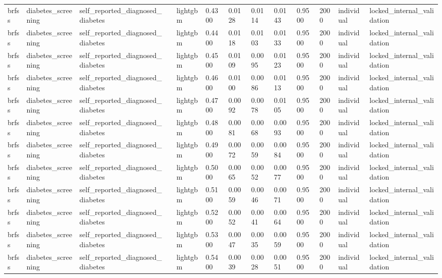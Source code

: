 \begin{tabular}{lllllllllllll}
brfss & diabetes\_screening & self\_reported\_diagnosed\_diabetes &  & lightgbm & 0.4300 & 0.0128 & 0.0114 & 0.0143 & 0.9500 & 2000 & individual & locked\_internal\_validation \\
brfss & diabetes\_screening & self\_reported\_diagnosed\_diabetes &  & lightgbm & 0.4400 & 0.0118 & 0.0103 & 0.0133 & 0.9500 & 2000 & individual & locked\_internal\_validation \\
brfss & diabetes\_screening & self\_reported\_diagnosed\_diabetes &  & lightgbm & 0.4500 & 0.0109 & 0.0095 & 0.0123 & 0.9500 & 2000 & individual & locked\_internal\_validation \\
brfss & diabetes\_screening & self\_reported\_diagnosed\_diabetes &  & lightgbm & 0.4600 & 0.0100 & 0.0086 & 0.0113 & 0.9500 & 2000 & individual & locked\_internal\_validation \\
brfss & diabetes\_screening & self\_reported\_diagnosed\_diabetes &  & lightgbm & 0.4700 & 0.0092 & 0.0078 & 0.0105 & 0.9500 & 2000 & individual & locked\_internal\_validation \\
brfss & diabetes\_screening & self\_reported\_diagnosed\_diabetes &  & lightgbm & 0.4800 & 0.0081 & 0.0068 & 0.0093 & 0.9500 & 2000 & individual & locked\_internal\_validation \\
brfss & diabetes\_screening & self\_reported\_diagnosed\_diabetes &  & lightgbm & 0.4900 & 0.0072 & 0.0059 & 0.0084 & 0.9500 & 2000 & individual & locked\_internal\_validation \\
brfss & diabetes\_screening & self\_reported\_diagnosed\_diabetes &  & lightgbm & 0.5000 & 0.0065 & 0.0052 & 0.0077 & 0.9500 & 2000 & individual & locked\_internal\_validation \\
brfss & diabetes\_screening & self\_reported\_diagnosed\_diabetes &  & lightgbm & 0.5100 & 0.0059 & 0.0046 & 0.0071 & 0.9500 & 2000 & individual & locked\_internal\_validation \\
brfss & diabetes\_screening & self\_reported\_diagnosed\_diabetes &  & lightgbm & 0.5200 & 0.0052 & 0.0041 & 0.0064 & 0.9500 & 2000 & individual & locked\_internal\_validation \\
brfss & diabetes\_screening & self\_reported\_diagnosed\_diabetes &  & lightgbm & 0.5300 & 0.0047 & 0.0035 & 0.0059 & 0.9500 & 2000 & individual & locked\_internal\_validation \\
brfss & diabetes\_screening & self\_reported\_diagnosed\_diabetes &  & lightgbm & 0.5400 & 0.0039 & 0.0028 & 0.0051 & 0.9500 & 2000 & individual & locked\_internal\_validation \\

\end{tabular}
